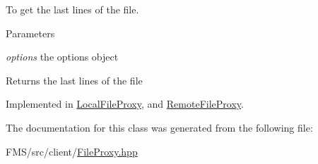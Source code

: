 To get the last lines of the file. 


\begin{DoxyParams}{Parameters}
\item[{\em options}]the options object \end{DoxyParams}
\begin{DoxyReturn}{Returns}
the last lines of the file 
\end{DoxyReturn}


Implemented in \hyperlink{classLocalFileProxy_aee171fefc216520156fd652b326bfb66}{LocalFileProxy}, and \hyperlink{classRemoteFileProxy_a45f18885dee050419b72e36283031bdb}{RemoteFileProxy}.



The documentation for this class was generated from the following file:\begin{DoxyCompactItemize}
\item 
FMS/src/client/\hyperlink{FileProxy_8hpp}{FileProxy.hpp}\end{DoxyCompactItemize}
